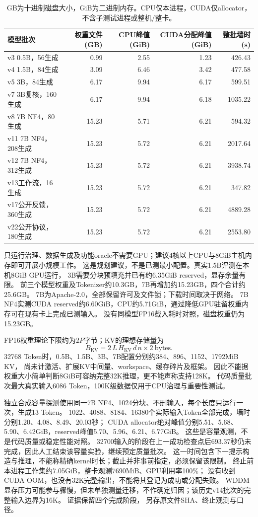 \documentclass[UTF8,a4paper,11pt,fontset=fandol]{ctexart}
\begin{document}
\begin{table}[ht]
\centering\small
\begin{tabular}{lrrrr}
\toprule
模型批次 & 权重文件(GB) & CPU峰值(GiB) & CUDA分配峰值(GiB) & 整批墙时(s)\\
\midrule
v3 0.5B，56生成 & 0.99 & 2.55 & 1.23 & 426.43\\
v4 1.5B，84生成 & 3.09 & 6.46 & 3.42 & 477.58\\
v5 3B，84生成 & 6.17 & 9.94 & 6.17 & 599.51\\
v7 3B复核，160生成 & 6.17 & 9.94 & 6.18 & 1035.22\\
v8 7B NF4，80生成 & 15.23 & 5.71 & 6.21 & 594.32\\
v11 7B NF4，208生成 & 15.23 & 5.72 & 6.21 & 2017.64\\
v12 7B NF4，312生成 & 15.23 & 5.72 & 6.21 & 3938.74\\
v13工作流，16生成 & 15.23 & 5.72 & 6.21 & 347.82\\
v17公开反馈，360生成 & 15.23 & 5.72 & 6.21 & 4889.28\\
v22公开协议，180生成 & 15.23 & 5.72 & 6.21 & 2553.80\\
\bottomrule
\end{tabular}
\caption{GB为十进制磁盘大小，GiB为二进制内存。CPU仅本进程，CUDA仅allocator，不含子测试进程或整机/整卡。}
\end{table}

只运行治理、数据生成及功能oracle不需要GPU；建议4核以上CPU与8GiB主机内存即可开展小规模工作。
这是规划建议，不是已测最小配置。真实1.5B评测在本机8GiB GPU运行，
3B需要分块预填充并已有约6.35GiB reserved，显存余量有限。
前三个模型权重及Tokenizer约10.3GB，7B再增加约15.23GB，四个合计约25.6GB。
7B为Apache-2.0\cite{qwen7}，全部保留许可及文件锁；下载时间取决于网络。
7B NF4实测CUDA reserved约6.60GiB，CPU约5.71GiB，通过降低GPU驻留权重内存可在现有卡上完成已测输入。
没有同模型FP16载入耗时对照，磁盘权重仍为15.23GB。

FP16权重理论下限约为$2P$字节；KV的理想存储量为
\[
 B_{\mathrm{KV}}=2\,L\,H_{\mathrm{KV}}\,d\,n\times2\ \mathrm{bytes}.
\]
32768 Token时，0.5B、1.5B、3B、7B配置分别约384、896、1152、1792MiB KV，
尚未计激活、扩展KV中间量、workspace、缓存碎片及框架。
因此不能据权重大小简单判断8GiB可容纳完整32K推理，更不能声称支持128K。
代码质量批次最大真实输入6086 Token，100K级数据仅用于CPU治理与重要性测试。

独立合成容量探测使用同一7B NF4、1024分块、不删输入，每个长度只运行一次，生成13 Token。
1022、4088、8184、16380个实际输入Token全部完成，墙时分别1.20、4.08、8.49、20.03秒；
CUDA allocator绝对峰值分别5.51、5.68、5.90、6.42GiB，reserved峰值5.70、5.96、6.21、6.77GiB。
这些是容量观测，不是代码质量或稳定性能对照。
32700输入的阶段在上一成功检查点后693.37秒仍未完成，因此人工结束该容量实验，继续预定质量批次。
这一时间包含下一提示构造与推理，不能称精确kernel时长；截止并非事前指定，必须保留该限制。
终止前本进程工作集约7.05GiB，整卡观测7690MiB、GPU利用率100\%；
没有收到CUDA OOM，也没有32K完整输出，不能将其登记为成功或分配失败。
WDDM显存压力可能参与骤慢，但未单独测量迁移，不作确定归因；该历史v14批次的完整输入边界为16K。
证据保留四个完成阶段，
另存原文件SHA、终止观测与口径。
\end{document}
